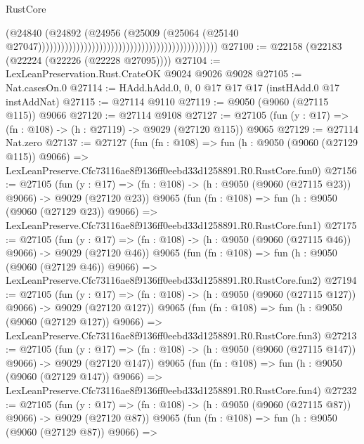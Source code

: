 \begin{lexlean}{RustCore}
\begin{coremodule}
                                                                                      (@24840
                                                                                        (@24892
                                                                                          (@24956
                                                                                            (@25009
                                                                                              (@25064
                                                                                                (@25140
                                                                                                  @27047)))))))))))))))))))))))))))))))))))))))))))))))
@27100 := @22158 (@22183 (@22224 (@22226 (@22228 @27095))))
@27104 := LexLeanPreservation.Rust.CrateOK @9024 @9026 @9028
@27105 := Nat.casesOn.{0}
@27114 := HAdd.hAdd.{0, 0, 0} @17 @17 @17 (instHAdd.{0} @17 instAddNat)
@27115 := @27114 @9110
@27119 := @9050 (@9060 (@27115 @115)) @9066
@27120 := @27114 @9108
@27127 := @27105 (fun (y : @17) => (fn : @108) -> (h : @27119) -> @9029 (@27120 @115)) @9065
@27129 := @27114 Nat.zero
@27137 := @27127
    (fun (fn : @108) =>
    fun (h : @9050 (@9060 (@27129 @115)) @9066) =>
    LexLeanPreserve.Cfc73116ae8f9136ff0eebd33d1258891.R0.RustCore.fun0)
@27156 := @27105
    (fun (y : @17) => (fn : @108) -> (h : @9050 (@9060 (@27115 @23)) @9066) -> @9029 (@27120 @23))
    @9065
    (fun (fn : @108) =>
    fun (h : @9050 (@9060 (@27129 @23)) @9066) =>
    LexLeanPreserve.Cfc73116ae8f9136ff0eebd33d1258891.R0.RustCore.fun1)
@27175 := @27105
    (fun (y : @17) => (fn : @108) -> (h : @9050 (@9060 (@27115 @46)) @9066) -> @9029 (@27120 @46))
    @9065
    (fun (fn : @108) =>
    fun (h : @9050 (@9060 (@27129 @46)) @9066) =>
    LexLeanPreserve.Cfc73116ae8f9136ff0eebd33d1258891.R0.RustCore.fun2)
@27194 := @27105
    (fun (y : @17) => (fn : @108) -> (h : @9050 (@9060 (@27115 @127)) @9066) -> @9029 (@27120 @127))
    @9065
    (fun (fn : @108) =>
    fun (h : @9050 (@9060 (@27129 @127)) @9066) =>
    LexLeanPreserve.Cfc73116ae8f9136ff0eebd33d1258891.R0.RustCore.fun3)
@27213 := @27105
    (fun (y : @17) => (fn : @108) -> (h : @9050 (@9060 (@27115 @147)) @9066) -> @9029 (@27120 @147))
    @9065
    (fun (fn : @108) =>
    fun (h : @9050 (@9060 (@27129 @147)) @9066) =>
    LexLeanPreserve.Cfc73116ae8f9136ff0eebd33d1258891.R0.RustCore.fun4)
@27232 := @27105
    (fun (y : @17) => (fn : @108) -> (h : @9050 (@9060 (@27115 @87)) @9066) -> @9029 (@27120 @87))
    @9065
    (fun (fn : @108) =>
    fun (h : @9050 (@9060 (@27129 @87)) @9066) =>

\end{coremodule}
\end{lexlean}
